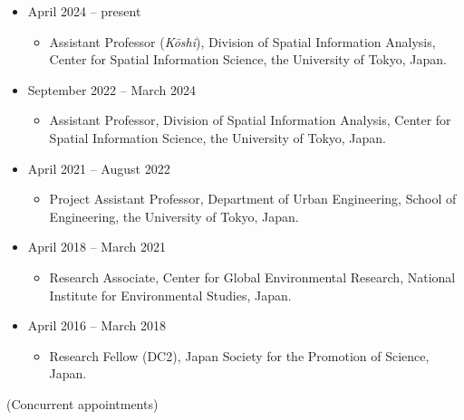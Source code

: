 \documentclass[
]{book}
\providecommand{\tightlist}{%
  \setlength{\itemsep}{0pt}\setlength{\parskip}{0pt}}
\begin{document}
\begin{itemize}
\tightlist
\item
  April 2024 -- present

  \begin{itemize}
  \tightlist
  \item
    Assistant Professor (\emph{Kōshi}),
    Division of Spatial Information Analysis, Center for Spatial Information Science, the University of Tokyo, Japan.
  \end{itemize}
\item
  September 2022 -- March 2024

  \begin{itemize}
  \tightlist
  \item
    Assistant Professor,
    Division of Spatial Information Analysis, Center for Spatial Information Science, the University of Tokyo, Japan.
  \end{itemize}
\item
  April 2021 -- August 2022

  \begin{itemize}
  \tightlist
  \item
    Project Assistant Professor,
    Department of Urban Engineering, School of Engineering, the University of Tokyo, Japan.
  \end{itemize}
\item
  April 2018 -- March 2021

  \begin{itemize}
  \tightlist
  \item
    Research Associate,
    Center for Global Environmental Research, National Institute for Environmental Studies, Japan.
  \end{itemize}
\item
  April 2016 -- March 2018

  \begin{itemize}
  \tightlist
  \item
    Research Fellow (DC2),
    Japan Society for the Promotion of Science, Japan.
  \end{itemize}
\end{itemize}

(Concurrent appointments)
\end{document}
